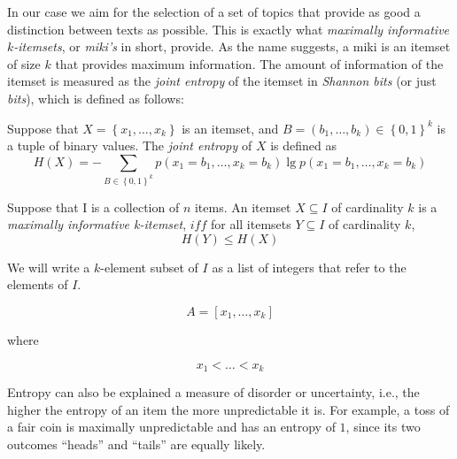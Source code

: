 In our case we aim for the selection of a set of topics that provide as good a distinction between texts as possible.
This is exactly what \emph{maximally informative $k$-itemsets}\citep{Knobbe2006}, or \emph{miki's} in short, provide.
As the name suggests, a miki is an itemset of size $k$ that provides maximum information.
The amount of information of the itemset is measured as the \emph{joint entropy} of the itemset in \emph{Shannon bits} (or just \emph{bits}), which is defined as follows: \citep{Knobbe2006}

\begin{definition}
    Suppose that $X = \left\{ x_{1}, \dots, x_{k} \right\}$ is an itemset, and $B = \left( b_{1}, \dots, b_{k} \right) \in \left\{ 0, 1 \right\}^{k}$ is a tuple of binary values. The \emph{joint entropy} of $X$ is defined as
    \begin{equation*}
        H(X) = -\sum_{B \in \left\{ 0, 1 \right\}^{k}} p \left( x_{1} = b_{1}, \dots, x_{k} = b_{k} \right) \lg p \left( x_{1} = b_{1}, \dots, x_{k} = b_{k} \right)
    \end{equation*}
    \label{def:joint_entropy}
\end{definition}

\begin{definition}
    Suppose that I is a collection of $n$ items. An itemset $X \subseteq I$ of cardinality $k$ is a \emph{maximally informative k-itemset}, $iff$ for all itemsets $Y \subseteq I$ of cardinality $k$,
    \begin{equation}
        H(Y) \leq H(X)
    \end{equation}
    \label{def:miki}
\end{definition}

We will write a $k$-element subset of $I$ as a list of integers that refer to the elements of $I$.

\begin{equation*}
    A = \left[ x_{1}, \dots, x_{k} \right]
\end{equation*}

\noindent where

\begin{equation*}
    x_{1} < \dots < x_{k}
\end{equation*}

Entropy can also be explained a measure of disorder or uncertainty, i.e., the higher the entropy of an item the more unpredictable it is.
For example, a toss of a fair coin is maximally unpredictable and has an entropy of $1$, since its two outcomes ``heads'' and ``tails'' are equally likely.

